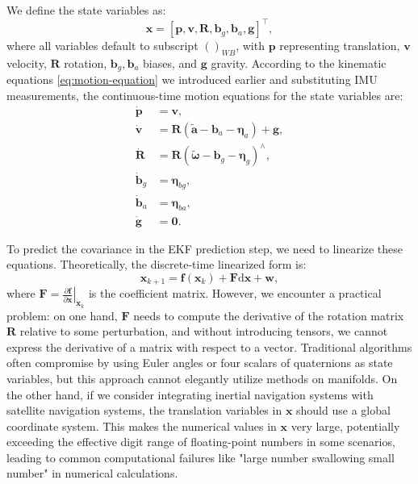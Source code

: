 We define the state variables as:
\begin{equation}\label{key}
	\bm{x} = [\bm{p}, \bm{v}, \bm{R}, \bm{b}_g, \bm{b}_a, \bm{g}]^\top,
\end{equation}
where all variables default to subscript $()_{WB}$, with $\bm{p}$ representing translation, $\bm{v}$ velocity, $\bm{R}$ rotation, $\bm{b}_g, \bm{b}_a$ biases, and $\bm{g}$ gravity. According to the kinematic equations \eqref{eq:motion-equation} we introduced earlier and substituting IMU measurements, the continuous-time motion equations for the state variables are:
\begin{subequations}\label{eq:ekf-continous}
	\begin{align}
		\dot{\bm{p}} &= \bm{v}, \\
		\dot{\bm{v}} &= \bm{R} (\tilde{\bm{a}} - \bm{b}_{a} - \boldsymbol{\eta}_a) + \bm{g}, \\
		\dot{\bm{R}} &= \bm{R} \left( \tilde{\boldsymbol{\omega}} - \bm{b}_{g} - \boldsymbol{\eta}_g 
		\right)^\wedge, \\
		\dot{\bm{b}}_{g} & = \boldsymbol{\eta}_{bg}, \\
		\dot{\bm{b}}_{a} & = \boldsymbol{\eta}_{ba}, \\ 
		\dot{\bm{g}} &= \bm{0}.
	\end{align}
\end{subequations}

To predict the covariance in the EKF prediction step, we need to linearize these equations. Theoretically, the discrete-time linearized form is:
\begin{equation}\label{key}
	\bm{x}_{k+1} = \bm{f} (\bm{x}_k) + \bm{F} \mathrm{d} \bm{x} + \bm{w},
\end{equation}
where $\bm{F} = \left. \frac{\partial \bm{f}}{\partial \bm{x}} \right|_{\bm{x}_{k}}$ is the coefficient matrix. However, we encounter a practical problem: on one hand, $\bm{F}$ needs to compute the derivative of the rotation matrix $\bm{R}$ relative to some perturbation, and without introducing tensors, we cannot express the derivative of a matrix with respect to a vector. Traditional algorithms often compromise by using Euler angles or four scalars of quaternions as state variables\cite{crassidis2006sigma}, but this approach cannot elegantly utilize methods on manifolds. On the other hand, if we consider integrating inertial navigation systems with satellite navigation systems, the translation variables in $\bm{x}$ should use a global coordinate system. This makes the numerical values in $\bm{x}$ very large, potentially exceeding the effective digit range of floating-point numbers in some scenarios, leading to common computational failures like "large number swallowing small number" in numerical calculations\cite{bonnans2006numerical}.

